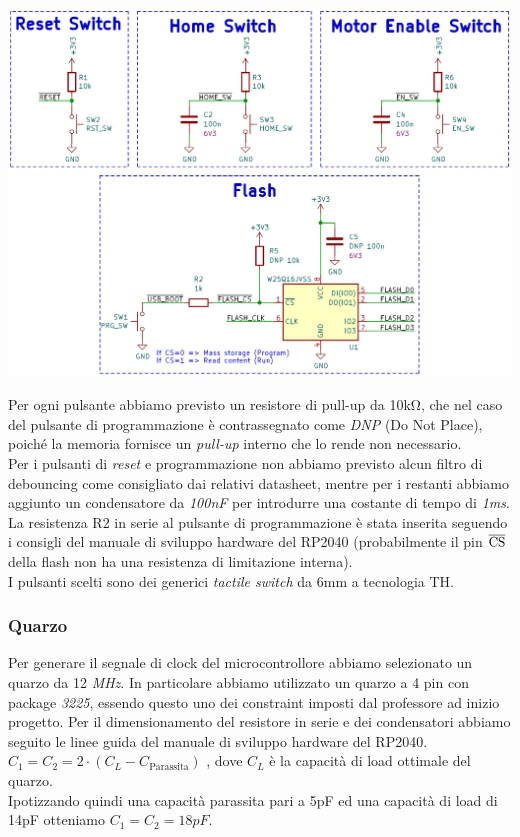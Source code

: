 \begin{center}
  \includegraphics[width=\textwidth]{figures/image16.png}
  \captionsetup{type=figure}
\end{center}

\noindent Per ogni pulsante abbiamo previsto un resistore di pull-up da 10kΩ, che
nel caso del pulsante di programmazione è contrassegnato come \emph{DNP}
(Do Not Place), poiché la memoria fornisce un \emph{pull-up} interno che
lo rende non necessario.\\
Per i pulsanti di \emph{reset} e programmazione non abbiamo previsto
alcun filtro di debouncing come consigliato dai relativi datasheet,
mentre per i restanti abbiamo aggiunto un condensatore da \emph{100nF}
per introdurre una costante di tempo di \emph{1ms}.\\
La resistenza R2 in serie al pulsante di programmazione è stata inserita
seguendo i consigli del manuale di sviluppo hardware del RP2040
(probabilmente il pin $\overline{\rm {CS}}$ della flash non ha una
resistenza di limitazione interna).\\
I pulsanti scelti sono dei generici \emph{tactile switch} da 6mm a
tecnologia TH.

\hypertarget{quarzo}{%
\subsubsection{Quarzo}\label{quarzo}}

Per generare il segnale di clock del microcontrollore abbiamo
selezionato un quarzo da 12 \emph{MHz}. In particolare abbiamo
utilizzato un quarzo a 4 pin con package \emph{3225}, essendo questo uno
dei constraint imposti dal professore ad inizio progetto. Per il
dimensionamento del resistore in serie e dei condensatori abbiamo
seguito le linee guida del manuale di sviluppo hardware del RP2040.\\
\(C_{1} = C_{2} = 2 \cdot (C_{L} - C_{\text{Parassita}})\)
, dove \(C_{L}\) è la capacità di load ottimale del quarzo.\\
Ipotizzando quindi una capacità parassita pari a 5pF ed una capacità di
load di 14pF otteniamo \(C_{1} = C_{2} =18pF\).

